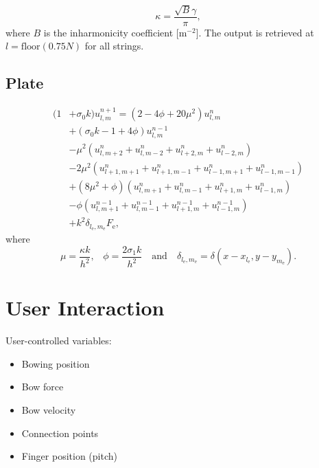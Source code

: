 \documentclass{article}
\begin{document}
\begin{equation}
    \kappa = \frac{\sqrt{B}\gamma}{\pi},
\end{equation}
where $B$ is the inharmonicity coefficient [m$^{-2}$].
The output is retrieved at $l = \text{floor}(0.75N)$ for all strings.

\subsection{Plate}

\begin{equation}
    \begin{aligned}\label{eq:plateImplementation}
        (1& + \sigma_0k)u_{l,m}^{n+1} = (2 - 4\phi + 20\mu^2)u_{l,m}^n\\
    &+ (\sigma_0 k - 1 + 4\phi) u_{l,m}^{n-1}\\
    &-\mu^2 (u_{l,m + 2}^n + u_{l,m - 2}^n + u_{l + 2,m}^n + u_{l - 2,m}^n)\\
    &- 2\mu^2(u_{l + 1,m + 1}^n + u_{l + 1,m - 1}^n + u_{l - 1,m + 1}^n + u_{l - 1,m - 1}^n)\\
    &+ (8\mu^2 + \phi)(u_{l,m + 1}^n + u_{l,m - 1}^n + u_{l + 1,m}^n + u_{l - 1,m}^n)\\
    &- \phi(u_{l,m + 1}^{n-1} + u_{l,m - 1}^{n-1} + u_{l + 1,m}^{n-1} + u_{l - 1,m}^{n-1})\\
    &+ k^2 \delta_{l_\text{e}, m_\text{e}}F_\text{e},
\end{aligned}
\end{equation}
where
\begin{equation}\nonumber
    \mu = \frac{\kappa k}{h^2} \text{,} \quad \phi = \frac{2\sigma_1k}{h^2} \quad \text{and} \quad \delta_{l_\text{e}, m_\text{e}} = \delta(x - x_{l_\text{e}}, y - y_{m_\text{e}}).
\end{equation}

\section{User Interaction}
User-controlled variables:
\begin{itemize}
    \item Bowing position
    \item Bow force
    \item Bow velocity
    \item Connection points
    \item Finger position (pitch)
\end{itemize}
\end{document}

